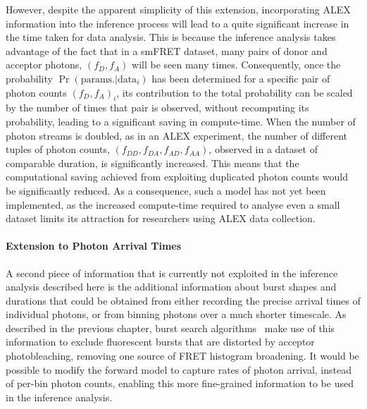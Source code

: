However, despite the apparent simplicity of this extension, incorporating ALEX information into the inference process will lead to a quite significant increase in the time taken for data analysis. This is because the inference analysis takes advantage of the fact that in a smFRET dataset, many pairs of donor and acceptor photons, $(f_D, f_A)$ will be seen many times. Consequently, once the probability $\Pr(\text{params.}|\text{data}_i)$ has been determined for a specific pair of photon counts $(f_D, f_A)_i$, its contribution to the total probability can be scaled by the number of times that pair is observed, without recomputing its probability, leading to a significant saving in compute-time. When the number of photon streams is doubled, as in an ALEX experiment, the number of different tuples of photon counts, $(f_{DD}, f_{DA}, f_{AD}, f_{AA})$, observed in a dataset of comparable duration, is significantly increased. This means that the computational saving achieved from exploiting duplicated photon counts would be significantly reduced. As a consequence,  such a model has not yet been implemented, as the increased compute-time required to analyse even a small dataset limits its attraction for researchers using ALEX data collection.   

\paragraph{Extension to Photon Arrival Times}
A second piece of information that is currently not exploited in the inference analysis described here is the additional information about burst shapes and durations that could be obtained from either recording the precise arrival times of individual photons, or from binning photons over a much shorter timescale. As described in the previous chapter, burst search algorithms~\cite{nir06} make use of this information to exclude fluorescent bursts that are distorted by acceptor photobleaching, removing one source of FRET histogram broadening. It would be possible to modify the forward model to capture rates of photon arrival, instead of per-bin photon counts, enabling this more fine-grained information to be used in the inference analysis.

